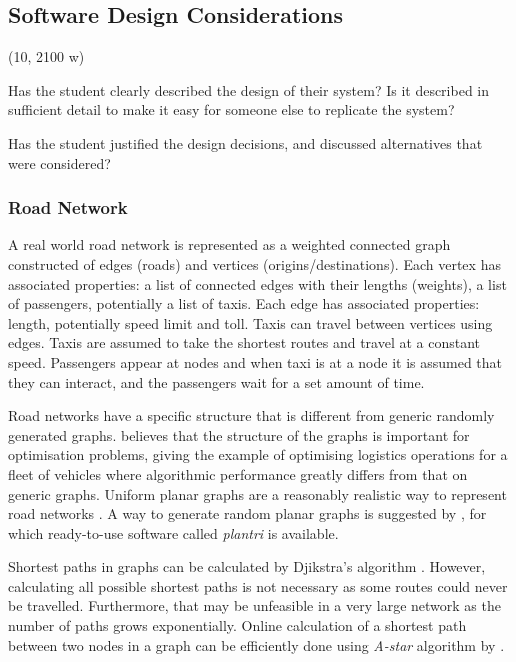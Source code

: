 \subsection{Software Design Considerations}

(10, 2100 w)

Has the student clearly described the design of their system? Is it described
in sufficient detail to make it easy for someone else to replicate the system?

Has the student justified the design decisions, and discussed alternatives that
were considered?


\subsubsection{Road Network}
\label{sec:design:network}

A real world road network is represented as a weighted connected graph
constructed of edges (roads) and vertices (origins/destinations). Each vertex
has associated properties: a list of connected edges with their lengths
(weights), a list of passengers, potentially a list of taxis. Each edge has
associated properties: length, potentially speed limit and toll. Taxis can
travel between vertices using edges. Taxis are assumed to take the shortest
routes and travel at a constant speed. Passengers appear at nodes and when taxi
is at a node it is assumed that they can interact, and the passengers wait for
a set amount of time.

Road networks have a specific structure that is different from generic randomly
generated graphs. \textcite{Eisenstat2011graphs+quadtree} believes that the
structure of the graphs is important for optimisation problems, giving the
example of optimising logistics operations for a fleet of vehicles where
algorithmic performance greatly differs from that on generic graphs. Uniform
planar graphs are a reasonably realistic way to represent road networks
\parencite{Eisenstat2011graphs+quadtree, Masucci2009graphs+london}. A way to
generate random planar graphs is suggested by
\textcite{Brinkmann2007graphs+generate}, for which ready-to-use software called
\textit{plantri} is available.

Shortest paths in graphs can be calculated by Djikstra's algorithm
\parencite{Cormen2009algorithms}. However, calculating all possible shortest
paths is not necessary as some routes could never be travelled. Furthermore,
that may be unfeasible in a very large network as the number of paths grows
exponentially. Online calculation of a shortest path between two nodes in a
graph can be efficiently done using \textit{A-star} algorithm by
\textcite{Hart1968paths}.



